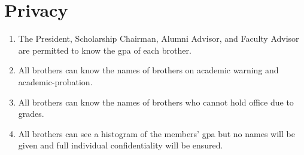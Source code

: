 \begin{enumerate}
\begin{enumerate}
	\end{enumerate}

\section{Privacy}
	\begin{enumerate}
		\item The President, Scholarship Chairman, Alumni Advisor, and Faculty Advisor are permitted to know the \gls{gpa} of each brother.

		\item All brothers can know the names of brothers on academic warning and \gls{academic-probation}.

		\item All brothers can know the names of brothers who cannot hold office due to grades.

		\item All brothers can see a histogram of the members' \gls{gpa} but no names will be given and full individual confidentiality will be ensured.

	\end{enumerate}
